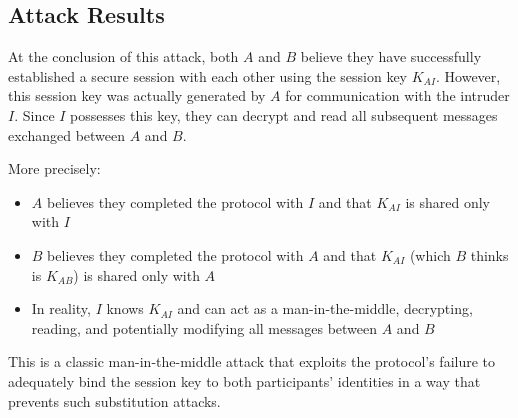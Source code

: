 \documentclass[11pt]{article}
\begin{document}
    \subsection{Attack Results}

    At the conclusion of this attack, both $A$ and $B$ believe they have successfully established a secure session with each other using the session key $K_{AI}$. However, this session key was actually generated by $A$ for communication with the intruder $I$. Since $I$ possesses this key, they can decrypt and read all subsequent messages exchanged between $A$ and $B$.

    More precisely:
    \begin{itemize}
        \item $A$ believes they completed the protocol with $I$ and that $K_{AI}$ is shared only with $I$
        \item $B$ believes they completed the protocol with $A$ and that $K_{AI}$ (which $B$ thinks is $K_{AB}$) is shared only with $A$
        \item In reality, $I$ knows $K_{AI}$ and can act as a man-in-the-middle, decrypting, reading, and potentially modifying all messages between $A$ and $B$
    \end{itemize}

    This is a classic man-in-the-middle attack that exploits the protocol's failure to adequately bind the session key to both participants' identities in a way that prevents such substitution attacks.
\end{document}
